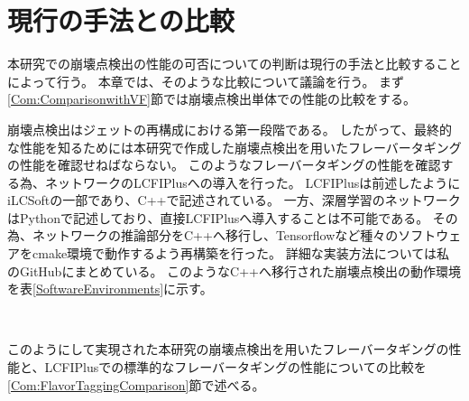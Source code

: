 
\chapter{現行の手法との比較} \label{chap:Comparison}

本研究での崩壊点検出の性能の可否についての判断は現行の手法と比較することによって行う。
本章では、そのような比較について議論を行う。
まず\ref{Com:ComparisonwithVF}節では崩壊点検出単体での性能の比較をする。

崩壊点検出はジェットの再構成における第一段階である。
したがって、最終的な性能を知るためには本研究で作成した崩壊点検出を用いたフレーバータギングの性能を確認せねばならない。
このようなフレーバータギングの性能を確認する為、ネットワークのLCFIPlusへの導入を行った。
LCFIPlusは前述したようにiLCSoftの一部であり、C++で記述されている。
一方、深層学習のネットワークはPythonで記述しており、直接LCFIPlusへ導入することは不可能である。
その為、ネットワークの推論部分をC++へ移行し、Tensorflowなど種々のソフトウェアをcmake環境で動作するよう再構築を行った。
詳細な実装方法については私のGitHubにまとめている\cite{GitHubGotoKLCFIPlus}。
このようなC++へ移行された崩壊点検出の動作環境を表\ref{SoftwareEnvironments}に示す。

\begin{table}[htb]
 \centering
　\small
  \caption{崩壊点検出のソフトウェア動作環境}
  \label{SoftwareEnvironments}
\end{table}

このようにして実現された本研究の崩壊点検出を用いたフレーバータギングの性能と、LCFIPlusでの標準的なフレーバータギングの性能についての比較を\ref{Com:FlavorTaggingComparison}節で述べる。


